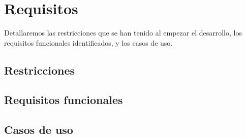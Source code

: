 \chapter{Requisitos}

\bigskip
Detallaremos las restricciones que se han tenido al empezar el desarrollo, los requisitos funcionales identificados, y los casos de uso.

\newpage
\section{Restricciones}


\section{Requisitos funcionales}


\section{Casos de uso}






